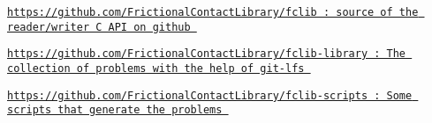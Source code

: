
\begin{DoxyItemize}
\item \href{https://github.com/FrictionalContactLibrary/fclib}{\tt https\+://github.\+com/\+Frictional\+Contact\+Library/fclib \+: source of the reader/writer C A\+PI on github }  
\item \href{https://github.com/FrictionalContactLibrary/fclib-library}{\tt https\+://github.\+com/\+Frictional\+Contact\+Library/fclib-\/library \+: The collection of problems with the help of git-\/lfs }  
\item \href{https://github.com/FrictionalContactLibrary/fclib-scripts}{\tt https\+://github.\+com/\+Frictional\+Contact\+Library/fclib-\/scripts \+: Some scripts that generate the problems }  
\end{DoxyItemize}